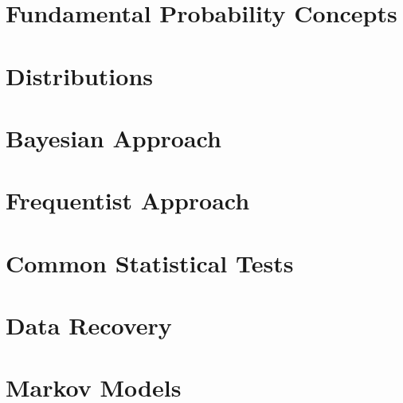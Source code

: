 \chapter{Fundamental Probability Concepts}


\chapter{Distributions}


\chapter{Bayesian Approach}


\chapter{Frequentist Approach}


\chapter{Common Statistical Tests}


\chapter{Data Recovery}


\chapter{Markov Models}

